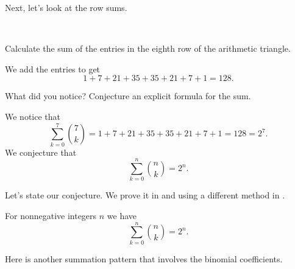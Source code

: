 Next, let's look at the row sums.

\begin{exam}
\label{exam_sum_rows_arith_triangle}
~
    \begin{apart}
        \item Calculate the sum of the entries in the eighth row of the arithmetic triangle. 
            \begin{soln}
                We add the entries to get
                    $$1+7+21+35+35+21+7+1 =128.$$
            \end{soln}
        \item What did you notice? Conjecture an explicit formula for the sum.
            \begin{soln}
            We notice that   
                   $$\sum_{k=0}^7\binom{7}{k} = 1+7+21+35+35+21+7+1 =128 = 2^7.$$
            We conjecture that 
                $$\sum_{k=0}^n\binom{n}{k}=2^n.$$
            \end{soln}        
    \end{apart} 
\end{exam}

Let's state our conjecture.  We prove it in  and using a different method in . %

\begin{thm}
\label{thm_sum_rows_arith_triangle}
    For nonnegative integers $n$ we have
        $$\sum_{k=0}^n\binom{n}{k}=2^n.$$
\end{thm}

Here is another summation pattern that involves the binomial coefficients.

